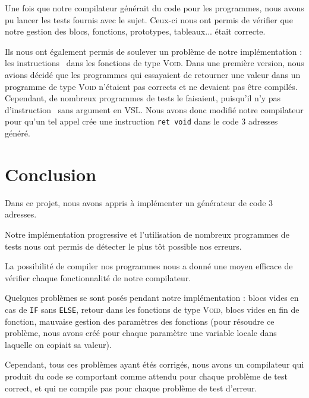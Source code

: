 \documentclass[french]{article}
\begin{document}
Une fois que notre compilateur générait du code pour les programmes, nous avons pu lancer les tests fournis avec le sujet. Ceux-ci nous ont permis de vérifier que notre gestion des blocs, fonctions, prototypes, tableaux... était correcte.

Ils nous ont également permis de soulever un problème de notre implémentation : les instructions \return\ dans les fonctions de type \textsc{Void}. Dans une première version, nous avions décidé que les programmes qui essayaient de retourner une valeur dans un programme de type \textsc{Void} n'étaient pas corrects et ne devaient pas être compilés. Cependant, de nombreux programmes de tests le faisaient, puisqu'il n'y pas d'instruction \return\ sans argument en VSL. Nous avons donc modifié notre compilateur pour qu'un tel appel crée une instruction \texttt{ret void} dans le code 3 adresses généré.

\section{Conclusion}
Dans ce projet, nous avons appris à implémenter un générateur de code 3 adresses.

Notre implémentation progressive et l'utilisation de nombreux programmes de tests nous ont permis de détecter le plus tôt possible nos erreurs.

La possibilité de compiler nos programmes nous a donné une moyen efficace de vérifier chaque fonctionnalité de notre compilateur.

Quelques problèmes se sont posés pendant notre implémentation : blocs vides en cas de \texttt{IF} sans \texttt{ELSE}, retour dans les fonctions de type \textsc{Void}, blocs vides en fin de fonction, mauvaise gestion des paramètres des fonctions (pour résoudre ce problème, nous avons créé pour chaque paramètre une variable locale dans laquelle on copiait sa valeur).

Cependant, tous ces problèmes ayant étés corrigés, nous avons un compilateur qui produit du code se comportant comme attendu pour chaque problème de test correct, et qui ne compile pas pour chaque problème de test d'erreur.
\end{document}
